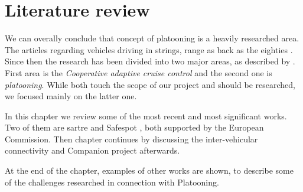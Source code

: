 \section{Literature review}\label{sec:literature}
% 
% 
We can overally conclude that concept of platooning is a heavily researched area. The articles regarding vehicles driving in strings, range as back as the eighties \cite{Peppard1974StringSystems}.
Since then the research has been divided into two major areas, as described by \cite{Vinel2015Vehicle-to-vehicleScenarios}. First area is the \emph{Cooperative adaptive cruise control} and the second one is \emph{platooning}. While both touch the scope of our project and should be researched, we focused mainly on the latter one.\par
% 
In this chapter we review some of the most recent and most significant works. Two of them are \acrshort{sartre} \cite{Chan2012ProjectSARTRE} and Safespot \cite{Safespot}, both supported by the European Commission. Then chapter continues by discussing the inter-vehicular connectivity and Companion \cite{2016CompanionProject} project afterwards.\par
% 
At the end of the chapter, examples of other works are shown, to describe some of the challenges researched in connection with Platooning.













